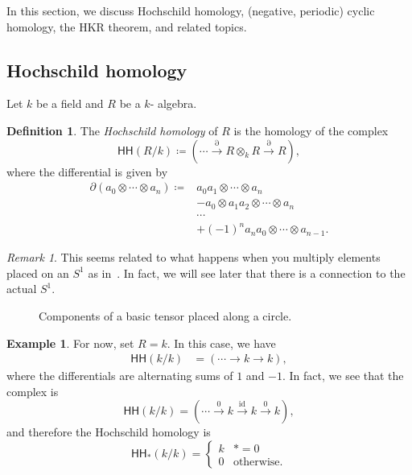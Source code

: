 \documentclass[10pt, oneside]{memoir}
\theoremstyle{definition}
\newtheorem{defn}[thm]{Definition}
\newtheorem{exm}[thm]{Example}
\theoremstyle{remark}
\newtheorem{rmk}[thm]{Remark}
\theoremstyle{plain}
\theoremstyle{definition}
\theoremstyle{remark}
\newcommand{\mr}[1]{\mathrm{#1}}
\newcommand{\ms}[1]{\mathsf{#1}}
\newcommand{\1}{\mathbf{1}}
\newcommand{\2}{\mathbf{2}}
\newcommand{\3}{\mathbf{3}}
\newcommand{\HH}{\ms{HH}}
\begin{document}
In this section, we discuss Hochschild homology, (negative, periodic) cyclic homology, the HKR theorem, and related topics.

\subsection{Hochschild homology}%
\label{sub:Hochschild homology}

Let \(k \) be a field and \(R \) be a \(k \)- algebra.

\begin{defn}
    The \textit{Hochschild homology} of \(R \) is the homology of the complex
    \[
        \HH(R/k) \coloneqq (\cdots \xrightarrow{\partial} R \otimes_k R \xrightarrow{\partial} R),
    \]
    where the differential is given by
    \begin{align*}
        \partial(a_0 \otimes \cdots \otimes a_n) \coloneqq{} & a_0 a_1 \otimes \cdots \otimes a_n \\
        &- a_0 \otimes a_1 a_2 \otimes \cdots \otimes a_n \\
        & \cdots \\
        &+ (-1)^n a_n a_0 \otimes \cdots \otimes a_{n-1}.
    \end{align*}
\end{defn}

\begin{rmk}
    This seems related to what happens when you multiply elements placed on an \(S^1 \) as in~. In fact, we will see later that there is a connection to the actual \(S^1 \).
    \begin{figure}[htpb]
    \begin{center}
    \end{center}
    \caption{Components of a basic tensor placed along a circle.}%
    \label{fig:hhcircle}
    \end{figure}
\end{rmk}

\begin{exm}
    For now, set \(R=k \). In this case, we have
    \begin{align*}
        \HH(k/k) &= (\cdots \to k \to k),
    \end{align*}
    where the differentials are alternating sums of \(1 \) and \(-1 \). In fact, we see that the complex is
    \[ \HH(k/k) = (\cdots \xrightarrow{0} k \xrightarrow{\mr{id}} k \xrightarrow{0}k), \]
    and therefore the Hochschild homology is
    \[ \HH_*(k/k) = \begin{cases}
        k & *=0 \\
        0 & \text{otherwise}.
    \end{cases} \]
\end{exm}
\end{document}

